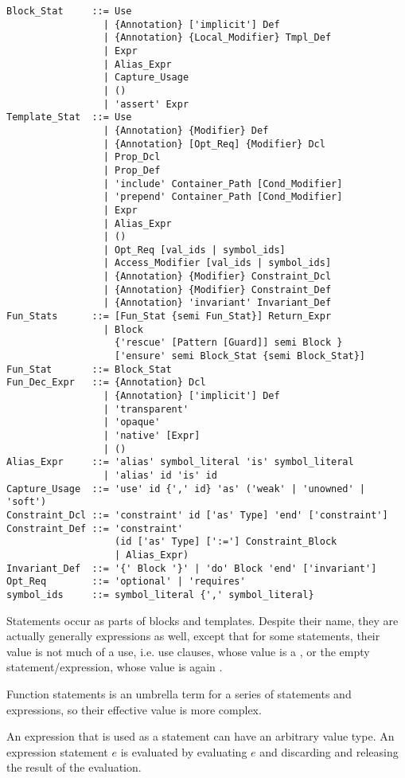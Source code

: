 \syntax\begin{lstlisting}
Block_Stat     ::= Use
                 | {Annotation} ['implicit'] Def
                 | {Annotation} {Local_Modifier} Tmpl_Def
                 | Expr
                 | Alias_Expr
                 | Capture_Usage
                 | ()
                 | 'assert' Expr
Template_Stat  ::= Use
                 | {Annotation} {Modifier} Def
                 | {Annotation} [Opt_Req] {Modifier} Dcl
                 | Prop_Dcl
                 | Prop_Def
                 | 'include' Container_Path [Cond_Modifier]
                 | 'prepend' Container_Path [Cond_Modifier]
                 | Expr
                 | Alias_Expr
                 | ()
                 | Opt_Req [val_ids | symbol_ids]
                 | Access_Modifier [val_ids | symbol_ids]
                 | {Annotation} {Modifier} Constraint_Dcl
                 | {Annotation} {Modifier} Constraint_Def
                 | {Annotation} 'invariant' Invariant_Def
Fun_Stats      ::= [Fun_Stat {semi Fun_Stat}] Return_Expr
                 | Block
                   {'rescue' [Pattern [Guard]] semi Block }
                   ['ensure' semi Block_Stat {semi Block_Stat}]
Fun_Stat       ::= Block_Stat
Fun_Dec_Expr   ::= {Annotation} Dcl
                 | {Annotation} ['implicit'] Def
                 | 'transparent'
                 | 'opaque'
                 | 'native' [Expr]
                 | ()
Alias_Expr     ::= 'alias' symbol_literal 'is' symbol_literal
                 | 'alias' id 'is' id
Capture_Usage  ::= 'use' id {',' id} 'as' ('weak' | 'unowned' | 'soft')
Constraint_Dcl ::= 'constraint' id ['as' Type] 'end' ['constraint']
Constraint_Def ::= 'constraint' 
                   (id ['as' Type] [':='] Constraint_Block 
                   | Alias_Expr)
Invariant_Def  ::= '{' Block '}' | 'do' Block 'end' ['invariant']
Opt_Req        ::= 'optional' | 'requires'
symbol_ids     ::= symbol_literal {',' symbol_literal}
\end{lstlisting}

Statements occur as parts of blocks and templates. Despite their name, they are actually generally expressions as well, except that for some statements, their value is not much of a use, i.e. use clauses, whose value is a , or the empty statement/expression, whose value is again . 

Function statements is an umbrella term for a series of statements and expressions, so their effective value is more complex. 

An expression that is used as a statement can have an arbitrary value type. An expression statement $e$ is evaluated by evaluating $e$ and discarding and releasing the result of the evaluation. 

